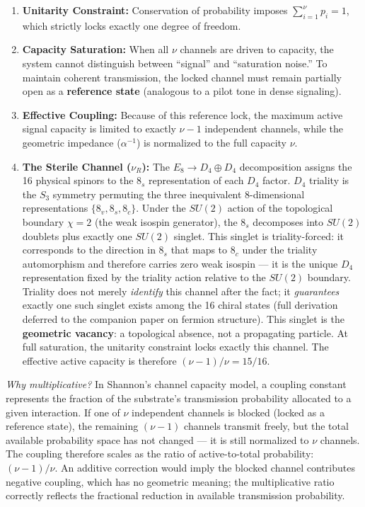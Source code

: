 \begin{enumerate}
    \item \textbf{Unitarity Constraint:} Conservation of probability imposes $\sum_{i=1}^{\nu} p_i = 1$, which strictly locks exactly one degree of freedom. 
    
    \item \textbf{Capacity Saturation:} When all $\nu$ channels are driven to capacity, the system cannot distinguish between ``signal'' and ``saturation noise.'' To maintain coherent transmission, the locked channel must remain partially open as a \textbf{reference state} (analogous to a pilot tone in dense signaling).
    
    \item \textbf{Effective Coupling:} Because of this reference lock, the maximum active signal capacity is limited to exactly $\nu-1$ independent channels, while the geometric impedance ($\alpha^{-1}$) is normalized to the full capacity $\nu$.

    \item \textbf{The Sterile Channel ($\nu_R$):} The $E_8 \to D_4 \oplus D_4$ decomposition assigns the 16 physical spinors to the $8_s$ representation of each $D_4$ factor. $D_4$ triality is the $S_3$ symmetry permuting the three inequivalent 8-dimensional representations $\{8_v, 8_s, 8_c\}$. Under the $SU(2)$ action of the topological boundary $\chi=2$ (the weak isospin generator), the $8_s$ decomposes into $SU(2)$ doublets plus exactly one $SU(2)$ singlet. This singlet is triality-forced: it corresponds to the direction in $8_s$ that maps to $8_c$ under the triality automorphism and therefore carries zero weak isospin --- it is the unique $D_4$ representation fixed by the triality action relative to the $SU(2)$ boundary. Triality does not merely \emph{identify} this channel after the fact; it \emph{guarantees} exactly one such singlet exists among the 16 chiral states (full derivation deferred to the companion paper on fermion structure). This singlet is the \textbf{geometric vacancy}: a topological absence, not a propagating particle. At full saturation, the unitarity constraint locks exactly this channel. The effective active capacity is therefore $(\nu-1)/\nu = 15/16$.
\end{enumerate}

\textit{Why multiplicative?} In Shannon's channel capacity model, a coupling constant represents the fraction of the substrate's transmission probability allocated to a given interaction. If one of $\nu$ independent channels is blocked (locked as a reference state), the remaining $(\nu-1)$ channels transmit freely, but the total available probability space has not changed --- it is still normalized to $\nu$ channels. The coupling therefore scales as the ratio of active-to-total probability: $(\nu-1)/\nu$. An additive correction would imply the blocked channel contributes negative coupling, which has no geometric meaning; the multiplicative ratio correctly reflects the fractional reduction in available transmission probability.


